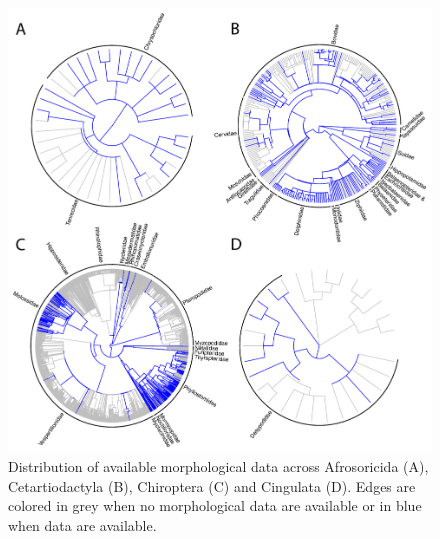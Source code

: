 \begin{figure}[!ht]
\centering
    \includegraphics[width=\textwidth]{Supplementaries/Figures/MissingMammals/Combined_phy1.pdf}
\caption[Available data in Afrosoricida, Cetartiodactyla, Chiroptera and Dasyuromorphia]{Distribution of available morphological data across Afrosoricida (A), Cetartiodactyla (B), Chiroptera (C) and Cingulata (D). Edges are colored in grey when no morphological data are available or in blue when data are available.}
\label{Supp_combined_phy1}
\end{figure}

